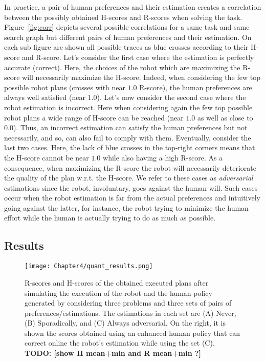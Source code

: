 In practice, a pair of human preferences and their estimation creates a correlation between the possibly obtained H-scores and R-scores when solving the task. Figure~\ref{fig:corr} depicts several possible correlations for a same task and same search graph but different pairs of human preferences and their estimation. On each sub figure are shown all possible traces as blue crosses according to their H-score and R-score. 
Let's consider the first case where the estimation is perfectly accurate (correct). Here, the choices of the robot which are maximizing the R-score will necessarily maximize the H-score. Indeed, when considering the few top possible robot plans (crosses with near $1.0$ R-score), the human preferences are always well satisfied (near $1.0$). 
Let's now consider the second case where the robot estimation is incorrect. Here when considering again the few top possible robot plans a wide range of H-score can be reached (near $1.0$ as well as close to $0.0$). Thus, an incorrect estimation can satisfy the human preferences but not necessarily, and so, can also fail to comply with them.
Eventually, consider the last two cases. Here, the lack of blue crosses in the top-right corners means that the H-score cannot be near $1.0$ while also having a high R-score. As a consequence, when maximizing the R-score the robot will necessarily deteriorate the quality of the plan w.r.t. the H-score. We refer to these cases as \textit{adversarial} estimations since the robot, involuntary, goes against the human will. Such cases occur when the robot estimation is far from the actual preferences and intuitively going against the latter, for instance, the robot trying to minimize the human effort while the human is actually trying to do as much as possible.  

    \subsection{Results}

\begin{figure}
    \centering
    \texttt{[image: Chapter4/quant\_results.png]}
    \caption{
    R-scores and H-scores of the obtained executed plans after simulating the execution of the robot and the human policy generated by considering three problems and three sets of pairs of preferences/estimations. 
    The estimations in each set are (A) Never, (B) Sporadically, and (C) Always adversarial. On the right, it is shown the scores obtained using an enhanced human policy that can correct online the robot's estimation while using the set (C). \textbf{TODO: [show H mean+min and R mean+min ?]}
    }    
    \label{fig:heatmaps}
\end{figure}

